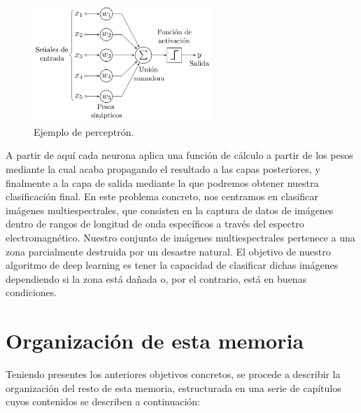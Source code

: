 \begin{figure}
    \centering
    \includegraphics[width=0.6\textwidth]{images/chapter1/perceptron.png}
    \caption{Ejemplo de perceptrón.}
    \label{fig:Perceptrón}
\end{figure}
A partir de aquí cada neurona aplica una función de cálculo a partir de los pesos mediante la cual acaba propagando el resultado a las capas posteriores, y
finalmente a la capa de salida mediante la que podremos obtener nuestra clasificación final.
En este problema concreto, nos centramos en clasificar imágenes multiespectrales,
que consisten en la captura de datos de imágenes dentro de rangos de longitud de onda específicos a través del espectro electromagnético.
Nuestro conjunto de imágenes multiespectrales pertenece a una zona parcialmente destruida por un desastre natural.
El objetivo de nuestro algoritmo de deep learning es tener la capacidad de clasificar dichas imágenes dependiendo si la zona está dañada o,
por el contrario, está en buenas condiciones.


\section{Organización de esta memoria}\label{sec:organización-de-esta-memoria}

Teniendo presentes los anteriores objetivos concretos, se procede a describir la organización del resto de esta memoria, estructurada en una serie de capítulos cuyos contenidos se
describen a continuación:

